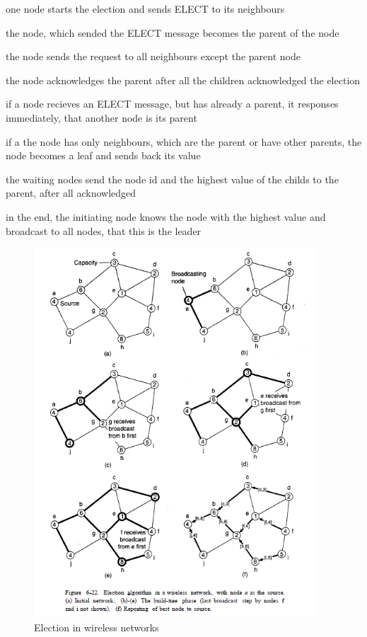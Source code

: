 \begin{compactenum}
\item one node starts the election and sends ELECT to its neighbours
\item the node, which sended the ELECT message becomes the parent of the node
\item the node sends the request to all neighbours except the parent node
\item the node acknowledges the parent after all the children acknowledged the election
\item if a node recieves an ELECT message, but has already a parent, it responses immediately, that another node is its parent
\item if a the node has only neighbours, which are the parent or have other parents, the node becomes a leaf and sends back its value
\item the waiting nodes send the node id and the highest value of the childs to the parent, after all acknowledged
\item in the end, the initiating node knows the node with the highest value and broadcast to all nodes, that this is the leader
\end{compactenum}
\begin{figure}[h]
	\centering
	\includegraphics[width=400px]{gfx/Leader_adhoc.png}
	\caption{Election in wireless networks}
	\label{img:Leader_adhoc}
\end{figure}

